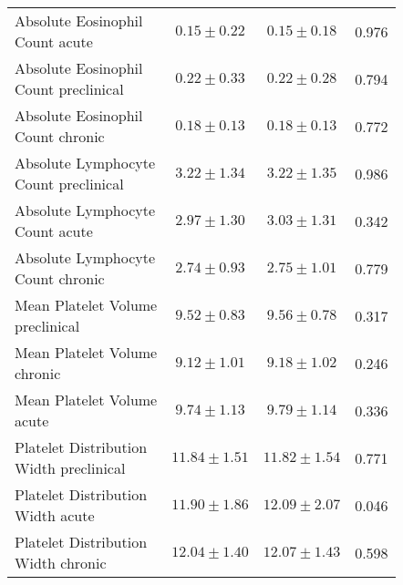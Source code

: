 \begin{table}[htbp]
\begin{tabular}{lccc}
\makecell[l]{Absolute Eosinophil \\ Count acute} & $0.15 \pm 0.22$ & $0.15 \pm 0.18$ & 0.976  \\

\makecell[l]{Absolute Eosinophil \\ Count preclinical} & $0.22 \pm 0.33$ & $0.22 \pm 0.28$ & 0.794  \\

\makecell[l]{Absolute Eosinophil \\ Count chronic} & $0.18 \pm 0.13$ & $0.18 \pm 0.13$ & 0.772  \\

\makecell[l]{Absolute Lymphocyte \\ Count preclinical} & $3.22 \pm 1.34$ & $3.22 \pm 1.35$ & 0.986  \\

\makecell[l]{Absolute Lymphocyte \\ Count acute} & $2.97 \pm 1.30$ & $3.03 \pm 1.31$ & 0.342  \\

\makecell[l]{Absolute Lymphocyte \\ Count chronic} & $2.74 \pm 0.93$ & $2.75 \pm 1.01$ & 0.779  \\

\makecell[l]{Mean Platelet Volume \\ preclinical} & $9.52 \pm 0.83$ & $9.56 \pm 0.78$ & 0.317  \\

\makecell[l]{Mean Platelet Volume \\ chronic} & $9.12 \pm 1.01$ & $9.18 \pm 1.02$ & 0.246  \\

\makecell[l]{Mean Platelet Volume \\ acute} & $9.74 \pm 1.13$ & $9.79 \pm 1.14$ & 0.336  \\

\makecell[l]{Platelet Distribution \\ Width preclinical} & $11.84 \pm 1.51$ & $11.82 \pm 1.54$ & 0.771  \\

\makecell[l]{Platelet Distribution \\ Width acute} & $11.90 \pm 1.86$ & $12.09 \pm 2.07$ & 0.046  \\

\makecell[l]{Platelet Distribution \\ Width chronic} & $12.04 \pm 1.40$ & $12.07 \pm 1.43$ & 0.598  \\


\end{tabular}
\end{table}

